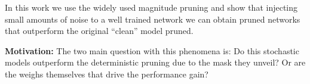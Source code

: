     In this work we use the widely used magnitude pruning and show that injecting small amounts of noise to a well
    trained network we can obtain pruned networks that  outperform the original
    ``clean'' model pruned.

    \textbf{Motivation:} The two main question with this phenomena is:
    Do this stochastic models outperform the deterministic pruning due to the
    mask they unveil? Or are the weighs themselves that drive the performance
    gain?











